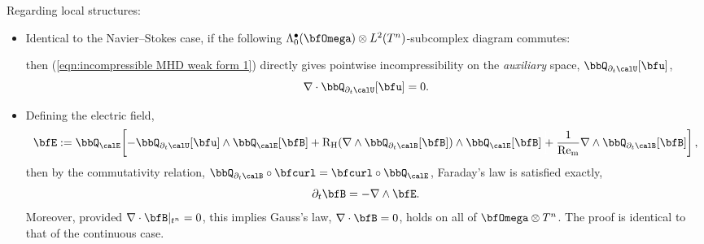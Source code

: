     Regarding local structures:
    \begin{itemize}
        \item  Identical to the Navier--Stokes case, if the following $\Lambda_{0}^{\bullet}(\bfOmega)\otimes L^{2}(T^{n})$-subcomplex diagram commutes:
        \begin{center}\end{center}
        then (\ref{eqn:incompressible MHD weak form 1}) directly gives pointwise incompressibility on the \emph{auxiliary} space, $\bbQ_{\partial_{t}\calU}[\bfu]$,
        \begin{equation}
            \nabla\cdot\bbQ_{\partial_{t}\calU}[\bfu]  =  0.
        \end{equation}

        \item  Defining the electric field,
        \begin{equation}
            \bfE
            :=  \bbQ_{\calE}\!\left[- \bbQ_{\partial_{t}\calU}[\bfu]\wedge\bbQ_{\calE}[\bfB]
            + \rmRH(\nabla\wedge\bbQ_{\partial_{t}\calB}[\bfB])\wedge\bbQ_{\calE}[\bfB]\tall
            + \frac{1}{\rmRem}\nabla\wedge\bbQ_{\partial_{t}\calB}[\bfB]\right],
        \end{equation}
        then by the commutativity relation, $\bbQ_{\partial_{t}\calB}\circ\bfcurl = \bfcurl\circ\bbQ_{\calE}$, Faraday's law is satisfied exactly,
        \begin{equation}
            \partial_{t}\bfB  =  - \nabla\wedge\bfE.
        \end{equation}
        Moreover, provided $\nabla\cdot\bfB|_{t^{n}} = 0$, this implies Gauss's law, $\nabla\cdot\bfB = 0$, holds on all of $\bfOmega\otimes T^{n}$. The proof is identical to that of the continuous case.
    \end{itemize}

    \line

    \begin{example}
    \end{example}
